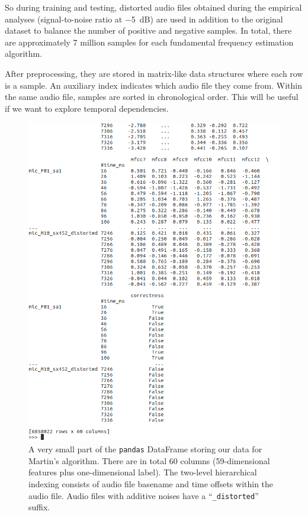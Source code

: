 \documentclass[11pt,a4paper]{report}
\begin{document}
So during training and testing, distorted audio files obtained during the empirical analyses (signal-to-noise ratio at \SI{-5}{\deci\bel}) are used in addition to the original dataset to balance the number of positive and negative samples.
In total, there are approximately 7 million samples for each fundamental frequency estimation algorithm.

\bigskip

After preprocessing, they are stored in matrix-like data structures where each row is a sample.
An auxiliary index indicates which audio file they come from.
Within the same audio file, samples are sorted in chronological order.
This will be useful if we want to explore temporal dependencies.

\begin{figure}[htbp]
  \centering
  \includegraphics[width=\textwidth]{df.png}
  \caption[Data storage scheme.]{A very small part of the \texttt{pandas} DataFrame storing our data for Martin's algorithm.
    There are in total 60 columns (59-dimensional features plus one-dimensional label).
    The two-level hierarchical indexing consists of audio file basename and time offsets within the audio file.
    Audio files with additive noises have a \enquote{\texttt{\_distorted}} suffix.}
  \label{fig:df}
\end{figure}
\end{document}
